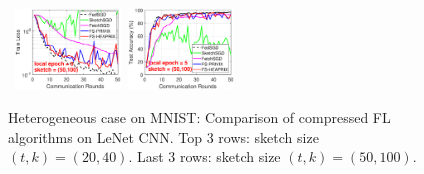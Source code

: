 \documentclass[sigconf, anonymous, review]{acmart}
\begin{document}
\begin{figure}[H]
\begin{center}
{		}
				\mbox{\hspace{-0.15in}		
		\includegraphics[width=0.25\textwidth]{MNIST_figures/local5_sketch50_iid0_train_loss.eps}\hspace{-0.12in}
		\includegraphics[width=0.25\textwidth]{MNIST_figures/local5_sketch50_iid0_test_acc.eps}
		}
	\end{center}
	
	\caption{Heterogeneous case on MNIST: Comparison of compressed FL algorithms on LeNet CNN. Top 3 rows: sketch size $(t,k)=(20,40)$. Last 3 rows: sketch size $(t,k)=(50,100)$.}
    \label{fig:MNIST-iid0}
    
\end{figure}
\end{document}
